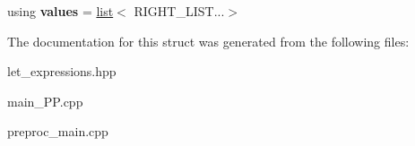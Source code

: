 \begin{DoxyCompactItemize}
\item 
\hypertarget{structtml_1_1impl_1_1multi__let__currifier_1_1split__in__middle_3_01tml_1_1list_3_01LEFT__LIST_84d079acf935021ec0ffe69943a037410_a80bbf507599ff7d121b6c78acc3b88ba}{using {\bfseries values} = \hyperlink{structtml_1_1list}{list}$<$ R\+I\+G\+H\+T\+\_\+\+L\+I\+S\+T...$>$}\label{structtml_1_1impl_1_1multi__let__currifier_1_1split__in__middle_3_01tml_1_1list_3_01LEFT__LIST_84d079acf935021ec0ffe69943a037410_a80bbf507599ff7d121b6c78acc3b88ba}

\end{DoxyCompactItemize}


The documentation for this struct was generated from the following files\+:\begin{DoxyCompactItemize}
\item 
let\+\_\+expressions.\+hpp\item 
main\+\_\+\+P\+P.\+cpp\item 
preproc\+\_\+main.\+cpp\end{DoxyCompactItemize}
